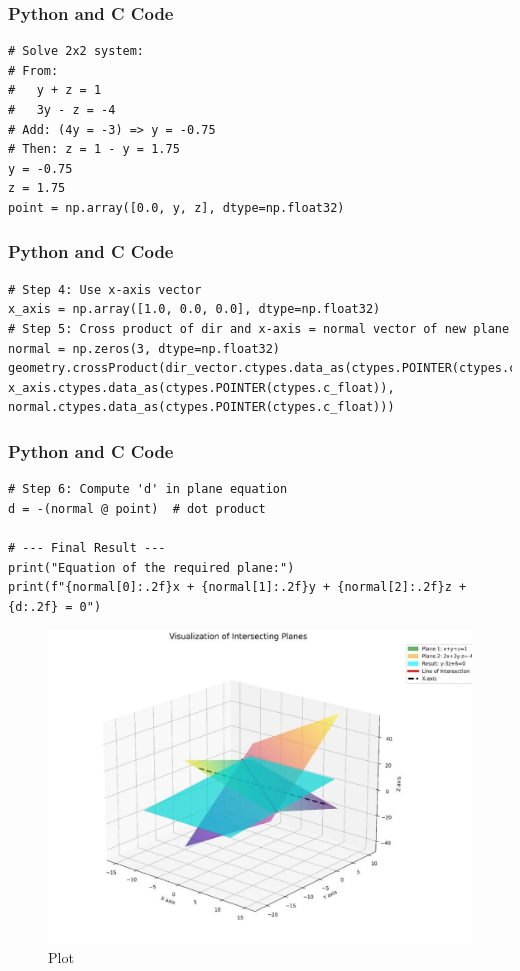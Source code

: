 \documentclass{beamer}
\begin{document}
\begin{frame}[fragile]
\frametitle{Python and C Code}
\begin{lstlisting}
# Solve 2x2 system:
# From:
#   y + z = 1
#   3y - z = -4
# Add: (4y = -3) => y = -0.75
# Then: z = 1 - y = 1.75
y = -0.75
z = 1.75
point = np.array([0.0, y, z], dtype=np.float32)
\end{lstlisting}
\end{frame}

\begin{frame}[fragile]
\frametitle{Python and C Code}
\begin{lstlisting}
# Step 4: Use x-axis vector
x_axis = np.array([1.0, 0.0, 0.0], dtype=np.float32)
# Step 5: Cross product of dir and x-axis = normal vector of new plane
normal = np.zeros(3, dtype=np.float32)
geometry.crossProduct(dir_vector.ctypes.data_as(ctypes.POINTER(ctypes.c_float)),
x_axis.ctypes.data_as(ctypes.POINTER(ctypes.c_float)),
normal.ctypes.data_as(ctypes.POINTER(ctypes.c_float)))
\end{lstlisting}
\end{frame}

\begin{frame}[fragile]
\frametitle{Python and C Code}
\begin{lstlisting}
# Step 6: Compute 'd' in plane equation
d = -(normal @ point)  # dot product

# --- Final Result ---
print("Equation of the required plane:")
print(f"{normal[0]:.2f}x + {normal[1]:.2f}y + {normal[2]:.2f}z + {d:.2f} = 0")

\end{lstlisting}
\end{frame}
\begin{frame}
\begin{figure}
    \centering
    \includegraphics[width=0.75\columnwidth]{graph.png}
    \caption{Plot}
    \label{fig:placeholder}
\end{figure}
\end{frame}
\end{document}
